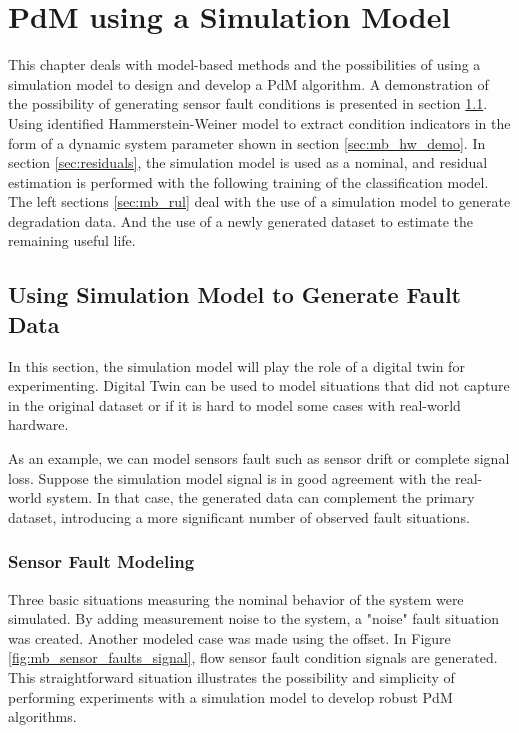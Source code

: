 %


\chapter{PdM using a Simulation Model}\label{ch:mb}
This chapter deals with model-based methods and the possibilities of using
a simulation model to design and develop a PdM algorithm. A demonstration
of the possibility of generating sensor fault conditions is presented in
section \ref{sec:sensor_fault_generation}.  Using identified
Hammerstein-Weiner model to extract condition indicators in the form of a
dynamic system parameter shown in section \ref{sec:mb_hw_demo}.  In section
\ref{sec:residuals}, the simulation model is used as a nominal, and
residual estimation is performed with the following training of the
classification model.  The left sections \ref{sec:mb_rul} deal with the use
of a simulation model to generate degradation data. And the use of a newly
generated dataset to estimate the remaining useful life.


\section{Using Simulation Model to Generate Fault Data}\label{sec:sensor_fault_generation}
In this section, the simulation model will play the role of a digital twin
for experimenting.  Digital Twin can be used to model situations that did
not capture in the original dataset or if it is hard to model some cases
with real-world hardware.

As an example, we can model sensors fault such as
sensor drift or complete signal loss. Suppose the simulation model signal
is in good agreement with the real-world system. In that case, the
generated data can complement the primary dataset, introducing a more
significant number of observed fault situations.



\subsection{Sensor Fault Modeling}

Three basic situations measuring the nominal behavior of the system were
simulated. By adding measurement noise to the system, a "noise" fault
situation was created. Another modeled case was made using the offset.  In
Figure \ref{fig:mb_sensor_faults_signal}, flow sensor fault condition
signals are generated. This straightforward situation illustrates the
possibility and simplicity of performing experiments with a simulation
model to develop robust PdM algorithms.

